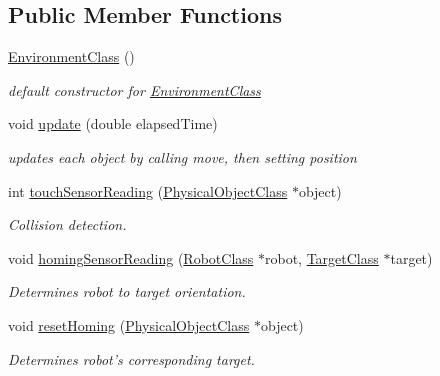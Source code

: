 \subsection*{Public Member Functions}
\begin{DoxyCompactItemize}
\item 
\hypertarget{classEnvironmentClass_aa69ad01551a79f7326f005709061ff31}{\hyperlink{classEnvironmentClass_aa69ad01551a79f7326f005709061ff31}{Environment\-Class} ()}\label{classEnvironmentClass_aa69ad01551a79f7326f005709061ff31}

\begin{DoxyCompactList}\small\item\em default constructor for \hyperlink{classEnvironmentClass}{Environment\-Class} \end{DoxyCompactList}\item 
void \hyperlink{classEnvironmentClass_a7d992b6ef4e8b95542af1ae775be988a}{update} (double elapsed\-Time)
\begin{DoxyCompactList}\small\item\em updates each object by calling move, then setting position \end{DoxyCompactList}\item 
int \hyperlink{classEnvironmentClass_a2c810b4fe1f93852659686ae392b0a8a}{touch\-Sensor\-Reading} (\hyperlink{classPhysicalObjectClass}{Physical\-Object\-Class} $\ast$object)
\begin{DoxyCompactList}\small\item\em Collision detection. \end{DoxyCompactList}\item 
void \hyperlink{classEnvironmentClass_a47912774c37cc6185c0b409e4b7789e3}{homing\-Sensor\-Reading} (\hyperlink{classRobotClass}{Robot\-Class} $\ast$robot, \hyperlink{classTargetClass}{Target\-Class} $\ast$target)
\begin{DoxyCompactList}\small\item\em Determines robot to target orientation. \end{DoxyCompactList}\item 
void \hyperlink{classEnvironmentClass_a7dd5a652634672bbaf5c00e214add9f6}{reset\-Homing} (\hyperlink{classPhysicalObjectClass}{Physical\-Object\-Class} $\ast$object)
\begin{DoxyCompactList}\small\item\em Determines robot's corresponding target. \end{DoxyCompactList}\item 

\end{DoxyCompactItemize}
